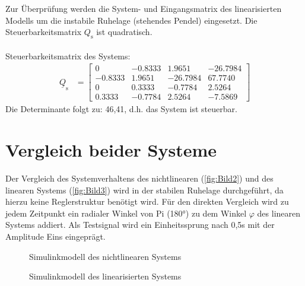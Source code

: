 \documentclass[
	pagesize,
	fontsize=12pt,
	paper=a4,
	oneside,
   reqno
]{scrartcl}
\begin{document}
Zur Überprüfung werden die System- und Eingangsmatrix des linearisierten Modells um die instabile Ruhelage (stehendes Pendel) eingesetzt. Die Steuerbarkeitsmatrix $Q_{\mathrm{s}}$ ist quadratisch.\\
\\Steuerbarkeitsmatrix des Systems:
\begin{align}\label{eq:Gleichung35}
    \underline{Q}_{\mathrm{s}} &=
    \begin{bmatrix}
        0 & -0.8333 & 1.9651 & -26.7984 \\
        -0.8333 & 1.9651 & -26.7984 & 67.7740 \\
        0 & 0.3333 & -0.7784 & 2.5264 \\
        0.3333 & -0.7784 & 2.5264 & -7.5869
    \end{bmatrix}
\end{align}
Die Determinante folgt zu: 46,41, d.h. das System ist steuerbar.

\clearpage

\section{Vergleich beider Systeme}
Der Vergleich des Systemverhaltens des nichtlinearen (\autoref{fig:Bild2}) und des linearen Systems (\autoref{fig:Bild3}) wird in der stabilen Ruhelage durchgeführt, da hierzu keine Reglerstruktur benötigt wird. Für den direkten Vergleich wird zu jedem Zeitpunkt ein radialer Winkel von Pi (180°) zu dem Winkel $\varphi$ des linearen Systems addiert. Als Testsignal wird ein Einheitssprung nach 0,5s mit der Amplitude Eins eingeprägt.
\begin{figure}[H]
   \centering
   \caption[Simulinkmodell des nichtlinearen Systems]{Simulinkmodell des nichtlinearen Systems}
   \label{fig:Bild2}
\end{figure}

\begin{figure}[H]
   \centering
   \caption[Simulinkmodell des linearisierten Systems]{Simulinkmodell des linearisierten Systems}
   \label{fig:Bild3}
\end{figure}
\end{document}
